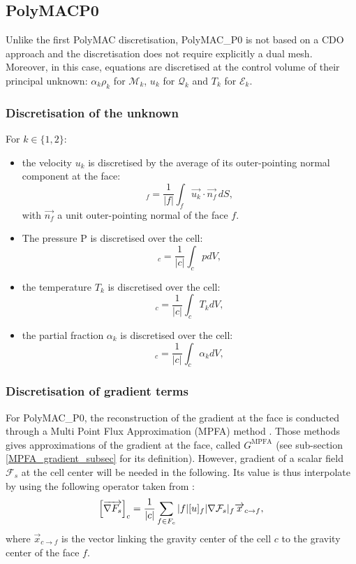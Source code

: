 \subsection{PolyMAC\textunderscore{}P0}
Unlike the first PolyMAC discretisation, PolyMAC\_P0 is not based on a CDO approach and the discretisation does not require explicitly a dual mesh. Moreover, in this case, equations are discretised at the control volume of their principal unknown: $\alpha _k \rho _k$ for $\mathcal{M}_k$, $u_k$ for $\mathcal{Q}_k$ and $T_k$ for $\mathcal{E}_k$.

\subsubsection{Discretisation of the unknown}
For $k \in \{1,2\}$:
\begin{itemize}
    \item the velocity $ u_k $ is discretised by the average of its outer-pointing normal component at the face:
    \begin{equation}
        [u_k] _f = \frac{1}{|f|} \int _f \vec{u_k} \cdot \vec{n_f} \,  dS,
    \end{equation}
    with $\vec{n_f}$ a unit outer-pointing normal of the face $f$.
    \item The pressure P is discretised over the cell:
    \begin{equation}
        [P]_c = \frac{1}{|c|} \int _c p dV,
    \end{equation}
    \item the temperature $T_k$ is discretised over the cell:
    \begin{equation}
        [T_k]_c = \frac{1}{|c|} \int _c T_k dV,
    \end{equation}
    \item the partial fraction $ \alpha _k$ is discretised over the cell:
    \begin{equation}
        [\alpha _k]_c = \frac{1}{|c|} \int _c \alpha _k dV,
    \end{equation}
\end{itemize}
\subsubsection*{Discretisation of gradient terms}
For PolyMAC\_P0, the reconstruction of the gradient at the face is conducted through a Multi Point Flux Approximation (MPFA) method \cite[section 4.1]{droniou2018gradient}. Those methods gives approximations of the gradient at the face, called $G^{\text{MPFA}}$ (see sub-section \ref{MPFA_gradient_subsec} for its definition). However, gradient of a scalar field $\mathcal{F}_s$ at the cell center will be needed in the following. Its value is thus interpolate by using the following operator taken from \cite{bonelle2014}:
\begin{equation}
    \left[ \overrightarrow{\nabla F_s} \right]_c = \frac{1}{|c|} \sum _{f \in F_c} |f| [u]_f |\nabla  \mathcal{F}_s |_f \overrightarrow{x}_{c \rightarrow f},
\end{equation}
where $\vec{x}_{c \rightarrow f}$ is the vector linking the gravity center of the cell $c$ to the gravity center of the face $f$.

